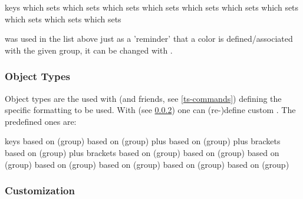\documentclass{article}
\begin{document}
\begin{describelist*}{keys}
   {which sets }
   {which sets }
   {which sets }
   {which sets }
   {which sets }
   {which sets }
   {which sets }
   {which sets }
    {which sets }
    {which sets }
\end{describelist*}
\begin{tsremark}
 was used in the list above just as a 'reminder' that a color is defined/associated with the given group, it can be changed with .
\end{tsremark}

\subsubsection{Object Types}\label{obj-types}
Object types are the  used with \tsobj{\tsobj} (and friends, see \ref{ts-commands}) defining the specific formatting to be used.
With  (see \ref{format-custom}) one can (re-)define custom . 
The predefined ones are:

\begin{describelist*}{keys}
   {based on (group) }
   {based on (group)  plus }
   {based on (group)  plus brackets}
   {based on (group)  plus brackets}
   {based on (group) }
   {based on (group) }
   {based on (group) }
   {based on (group) }
   {based on (group) }
    {based on (group) }
    {based on (group) }
\end{describelist*}

\subsubsection{Customization}\label{format-custom}
\end{document}
